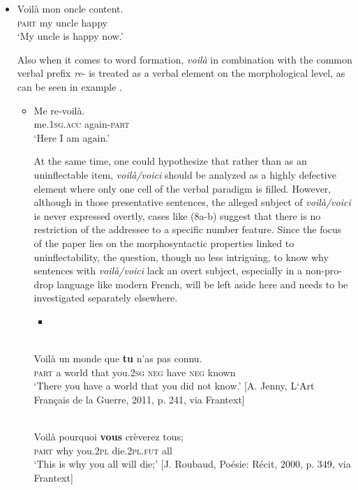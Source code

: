 \documentclass[output=paper]{langscibook}
\begin{document}
\begin{itemize}
\begin{itemize}
\begin{itemize}
\begin{itemize}
\begin{itemize}
\begin{itemize}
\item \gll Voilà mon oncle content.\\
     \textsc{part} my uncle happy\\
\glt ‘My uncle is happy now.’
\z %

Also when it comes to word formation, \textit{voilà} in combination with the common verbal prefix \textit{re}{}- is treated as a verbal element on the morphological level, as can be seen in example . 

\begin{itemize}
\item \gll Me re-voilà.\\
     me.\textsc{1sg.acc} again-\textsc{part}\\
\glt ‘Here I am again.’
\z %

At the same time, one could hypothesize that rather than as an uninflectable item, \textit{voilà/voici} should be analyzed as a highly defective element where only one cell of the verbal paradigm is filled. However, although in those presentative sentences, the alleged subject of \textit{voilà/voici} is never expressed overtly, cases like (8a-b) suggest that there is no restriction of the addressee to a specific number feature. Since the focus of the paper lies on the morphosyntactic properties linked to uninflectability, the question, though no less intriguing, to know why sentences with \textit{voilà/voici} lack an overt subject, especially in a non-pro-drop language like modern French, will be left aside here and needs to be investigated separately elsewhere. 

\begin{itemize}
\item \end{itemize}
\ea\label{ex:key:}
\\
\gll Voilà un monde que \textbf{tu} n’as pas connu.\\
     \textsc{part} a world that you.\textsc{2sg} \textsc{neg} have \textsc{neg} known\\
\glt ‘There you have a world that you did not know.’ [A. Jenny, L‘Art Français de la Guerre, 2011, p. 241, via Frantext]
\z %

\ea\label{ex:key:}
\\
\gll Voilà pourquoi \textbf{vous} crèverez tous;\\
     \textsc{part} why you.\textsc{2pl} die.\textsc{2pl.fut} all\\
\glt ‘This is why you all will die;’ [J. Roubaud, Poésie: Récit, 2000, p. 349, via Frantext]
\z %


\end{itemize}
\end{itemize}
\end{itemize}
\end{itemize}
\end{itemize}
\end{itemize}
\end{itemize}
\end{document}
